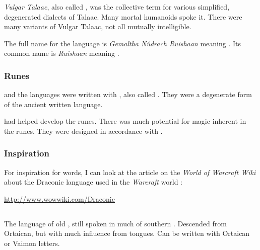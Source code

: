 \subsubsection{\CommonDraconic}
\emph{Vulgar Talaac}, also called \emph{\CommonDraconic}, was the collective term for various simplified, degenerated dialects of Talaac. 
Many mortal humanoids spoke it.
There were many variants of Vulgar Talaac, not all mutually intelligible. 

The full name for the language is \emph{Gemaltha N\^udrach Ruishaan} meaning .
Its common name is \emph{Ruishaan} meaning .





\subsubsection{Runes}
\Draconic and the \quiljaaran languages were written with , also called .
They were a degenerate form of the ancient \ophidian written language.

\Sethicus had helped develop the runes. 
There was much potential for magic inherent in the runes. 
They were designed in accordance with . 





\subsubsection{Inspiration}
For inspiration for \Draconic words, I can look at the article on the \emph{World of Warcraft Wiki} about the Draconic language used in the \emph{Warcraft} world \cite{VideoGame:Warcraft}: 

\href{http://www.wowwiki.com/Draconic}{http://www.wowwiki.com/Draconic}









\subsection{\Tepharin}
The language of old \Tephar, still spoken in much of southern \Velcad. 
Descended from Ortaican, but with much influence from \human{} tongues. 
Can be written with Ortaican or Vaimon letters. 

